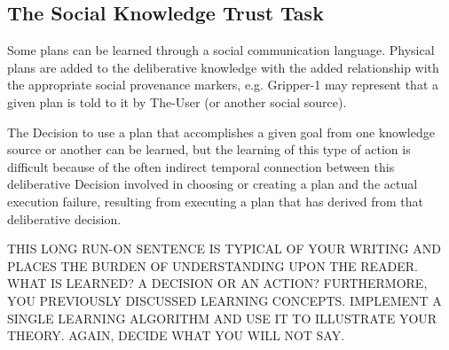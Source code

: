 \documentclass[twoside,letterpaper,11pt]{article}
\begin{document}
\subsection{The Social Knowledge Trust Task}

        Some plans can be learned through a social communication
        language.  Physical plans are added to the deliberative
        knowledge with the added relationship with the appropriate
        social provenance markers, e.g. Gripper-1 may represent that a
        given plan is told to it by The-User (or another social
        source).

        The Decision to use a plan that accomplishes a given goal from
        one knowledge source or another can be learned, but the
        learning of this type of action is difficult because of the
        often indirect temporal connection between this deliberative
        Decision involved in choosing or creating a plan and the
        actual execution failure, resulting from executing a plan that
        has derived from that deliberative decision.

THIS LONG RUN-ON SENTENCE IS TYPICAL OF YOUR WRITING AND PLACES THE BURDEN OF UNDERSTANDING UPON THE READER. WHAT IS LEARNED? A DECISION OR AN ACTION? FURTHERMORE, YOU PREVIOUSLY DISCUSSED LEARNING CONCEPTS. IMPLEMENT A SINGLE LEARNING ALGORITHM AND USE IT TO ILLUSTRATE YOUR THEORY. AGAIN, DECIDE WHAT YOU WILL NOT SAY.
\end{document}
